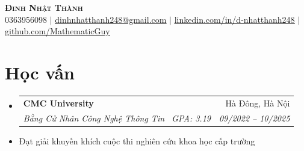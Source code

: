 \documentclass[letterpaper,11pt]{article}
\makeatletter
\newcommand{\resumeItem}[1]{
	\item\small{
	{#1 \vspace{-2pt}}
	}
}
\newcommand{\resumeSubheading}[4]{
	\vspace{-2pt}\item
	\begin{tabular*}{0.97\textwidth}[t]{l@{\extracolsep{\fill}}r}
		\textbf{#1} & #2 \\
		\textit{\small#3} & \textit{\small #4} \\
	\end{tabular*}\vspace{-7pt}
}
\newcommand{\resumeSubHeadingListStart}{\begin{itemize}[leftmargin=0.15in, label={}]}
\newcommand{\resumeSubHeadingListEnd}{\end{itemize}}
\makeatother
\begin{document}

\begin{center}
    \textbf{\Huge \scshape Đinh Nhật Thành} \\ \vspace{1pt}
    \small 0363956098 $|$ \href{mailto:x@x.com}{\underline{dinhnhatthanh248@gmail.com}} $|$
    \href{https://linkedin.com/in/...}{\underline{linkedin.com/in/d-nhatthanh248}} $|$
    \href{https://github.com/...}{\underline{github.com/MathematicGuy}}
\end{center}


\section{Học vấn}
	\resumeSubHeadingListStart
	\resumeSubheading
		{CMC University} {Hà Đông, Hà Nội}
		{Bằng Cử Nhân Công Nghệ Thông Tin \textbar \ GPA: 3.19}{09/2022 -- 10/2025}
		\resumeItem{Đạt giải khuyến khích cuộc thi nghiên cứu khoa học cấp trường}
	\resumeSubHeadingListEnd

\end{document}
